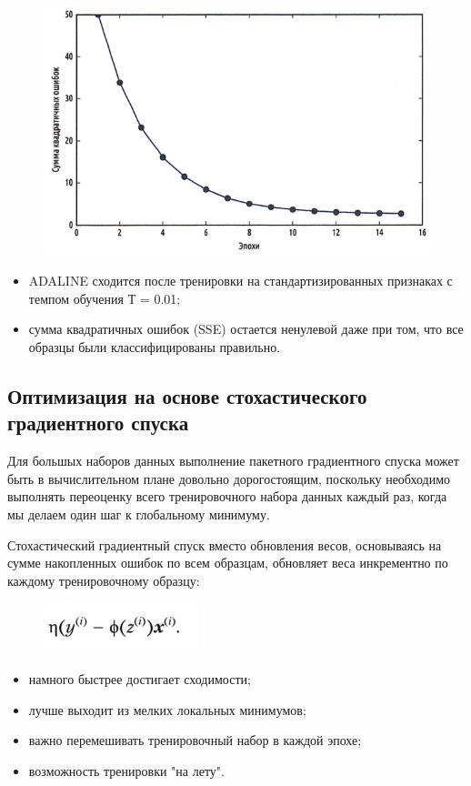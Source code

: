 \documentclass{beamer}
\begin{document}
\begin{frame}[t]
\begin{figure}[h]
\centering
\includegraphics[scale=0.6]{images/lec03-pic32.png}
\end{figure}
\begin{itemize}
\item ADALINE сходится после тренировки на стандартизированных признаках с темпом обучения Т = 0.01; 
\item сумма квадратичных ошибок (SSE) остается ненулевой даже при том, что все
образцы были классифицированы правильно.
\end{itemize}
\end{frame}

\subsection{Оптимизация на основе стохастического градиентного спуска}

\begin{frame}[t]
Для большых наборов данных выполнение пакетного градиентного спуска может быть
в вычислительном плане довольно дорогостоящим, поскольку необходимо выполнять переоценку всего тренировочного набора данных каждый раз, когда мы делаем
один шаг к глобальному минимуму.
\begin{block}{Стохастический градиентный спуск}
вместо обновления весов, основываясь на сумме накопленных ошибок по всем образцам, обновляет веса инкрементно по каждому тренировочному образцу:
\begin{figure}[h]
\centering
\includegraphics[scale=0.6]{images/lec03-pic33.png}
\end{figure}
\begin{itemize}
\item намного быстрее достигает сходимости;
\item лучше выходит из мелких локальных минимумов;
\item важно перемешивать тренировочный набор в каждой эпохе;
\item возможность тренировки "на лету".
\end{itemize}
\end{block}
\end{frame}
\end{document}
